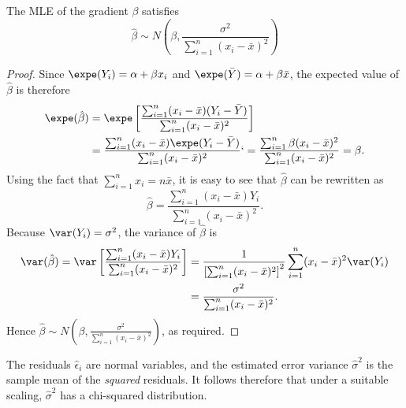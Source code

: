 \begin{lemma}%
The MLE of the gradient $\beta$ satisfies
$$\hat{\beta}\sim N\left(\beta,\frac{\sigma^2}{\sum_{i=1}^n(x_i-\bar{x})^2}\right)$$
\end{lemma}
\begin{proof}
Since $\expe(Y_i) = \alpha + \beta x_i$ and $\expe(\bar{Y}) = \alpha + \beta\bar{x}$, the expected value of $\hat{\beta}$ is therefore
\begin{align*}
\expe(\hat{\beta})
	& = \expe\left[\frac{\sum_{i=1}^n (x_i-\bar{x})(Y_i-\bar{Y})}{\sum_{i=1}^n (x_i-\bar{x})^2}\right] \\
	& = \frac{\sum_{i=1}^n (x_i-\bar{x})\expe(Y_i-\bar{Y})}{\sum_{i=1}^n (x_i-\bar{x})^2} 
`	= \frac{\sum_{i=1}^n \beta(x_i-\bar{x})^2}{\sum_{i=1}^n (x_i-\bar{x})^2} = \beta.
\end{align*}
Using the fact that $\sum_{i=1}^n x_i = n\bar{x}$, it is easy to see that $\hat{\beta}$ can be rewritten as
\[
\hat{\beta} = \frac{\sum_{i=1}^n (x_i-\bar{x})Y_i}{\sum_{i=1}^n (x_i-\bar{x})^2}.
\]
Because $\var(Y_i)=\sigma^2$, the variance of $\hat{\beta}$ is
\begin{align*}
\var(\hat{\beta})
	= \var\left[\frac{\sum_{i=1}^n (x_i-\bar{x})Y_i}{\sum_{i=1}^n (x_i-\bar{x})^2}\right]
	& = \frac{1}{\left[\sum_{i=1}^n(x_i-\bar{x})^2\right]^2}\sum_{i=1}^n(x_i-\bar{x})^2\var(Y_i) \\
	& = \frac{\sigma^2}{\sum_{i=1}^n(x_i-\bar{x})^2}.
\end{align*}
Hence $\hat{\beta}\sim N\left(\beta,\frac{\sigma^2}{\sum_{i=1}^n(x_i-\bar{x})^2}\right)$, as required.
\end{proof}

The residuals $\hat{\epsilon}_i$ are normal variables, and the estimated error variance $\hat{\sigma}^2$ is the sample mean of the \emph{squared} residuals. It follows therefore that under a suitable scaling, $\hat{\sigma}^2$ has a chi-squared distribution.


